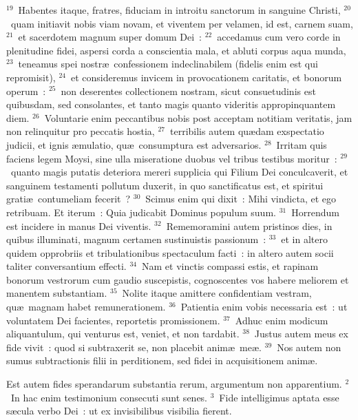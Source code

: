 ${}^{19}$~Habentes itaque, fratres, fiduciam in introitu sanctorum in sanguine Christi,
${}^{20}$~quam initiavit nobis viam novam, et viventem per velamen, id est, carnem suam,
${}^{21}$~et sacerdotem magnum super domum Dei~:
${}^{22}$~accedamus cum vero corde in plenitudine fidei, aspersi corda a conscientia mala, et abluti corpus aqua munda,
${}^{23}$~teneamus spei nostr\ae\ confessionem indeclinabilem (fidelis enim est qui repromisit),
${}^{24}$~et consideremus invicem in provocationem caritatis, et bonorum operum~:
${}^{25}$~non deserentes collectionem nostram, sicut consuetudinis est quibusdam, sed consolantes, et tanto magis quanto videritis appropinquantem diem.
${}^{26}$~Voluntarie enim peccantibus nobis post acceptam notitiam veritatis, jam non relinquitur pro peccatis hostia,
${}^{27}$~terribilis autem qu\ae dam exspectatio judicii, et ignis \ae mulatio, qu\ae\ consumptura est adversarios.
${}^{28}$~Irritam quis faciens legem Moysi, sine ulla miseratione duobus vel tribus testibus moritur~:
${}^{29}$~quanto magis putatis deteriora mereri supplicia qui Filium Dei conculcaverit, et sanguinem testamenti pollutum duxerit, in quo sanctificatus est, et spiritui grati\ae\ contumeliam fecerit~?
${}^{30}$~Scimus enim qui dixit~: Mihi vindicta, et ego retribuam. Et iterum~: Quia judicabit Dominus populum suum.
${}^{31}$~Horrendum est incidere in manus Dei viventis.
${}^{32}$~Rememoramini autem pristinos dies, in quibus illuminati, magnum certamen sustinuistis passionum~:
${}^{33}$~et in altero quidem opprobriis et tribulationibus spectaculum facti~: in altero autem socii taliter conversantium effecti.
${}^{34}$~Nam et vinctis compassi estis, et rapinam bonorum vestrorum cum gaudio suscepistis, cognoscentes vos habere meliorem et manentem substantiam.
${}^{35}$~Nolite itaque amittere confidentiam vestram, qu\ae\ magnam habet remunerationem.
${}^{36}$~Patientia enim vobis necessaria est~: ut voluntatem Dei facientes, reportetis promissionem.
${}^{37}$~Adhuc enim modicum aliquantulum, qui venturus est, veniet, et non tardabit.
${}^{38}$~Justus autem meus ex fide vivit~: quod si subtraxerit se, non placebit anim\ae\ me\ae .
${}^{39}$~Nos autem non sumus subtractionis filii in perditionem, sed fidei in acquisitionem anim\ae .

\lettrine[lines=3,image=true,loversize=0.05,lraise=-0.03]{E}{}st autem fides sperandarum substantia rerum, argumentum non apparentium.
${}^{2}$~In hac enim testimonium consecuti sunt senes.
${}^{3}$~Fide intelligimus aptata esse s\ae cula verbo Dei~: ut ex invisibilibus visibilia fierent.


